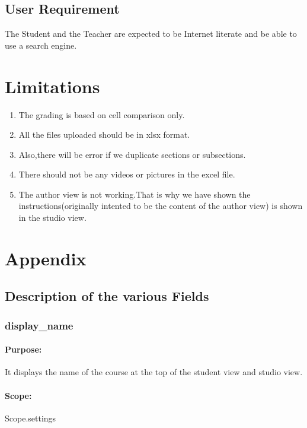 \documentclass{scrreprt}
\begin{document}
\section{User Requirement}
The Student and the Teacher are expected to be Internet literate and be able to use a
search engine.

\chapter{Limitations}
\begin{enumerate}
\item The grading is based on cell comparison only.

\item All the files uploaded should be in xlsx format.

\item Also,there will be error if we duplicate sections or subsections.

\item There should not be any videos or pictures in the excel file.

\item The author view is not working.That is why we have shown the instructions(originally 
intented to be the content of the author view) is shown in the studio view.

\end{enumerate}
\chapter{Appendix}

\section{Description of the various Fields}

\subsection{display_name}
\subsubsection{Purpose:}
It displays the name of the course at the top of the student view and studio view.
\subsubsection{Scope:}
Scope.settings
\end{document}
